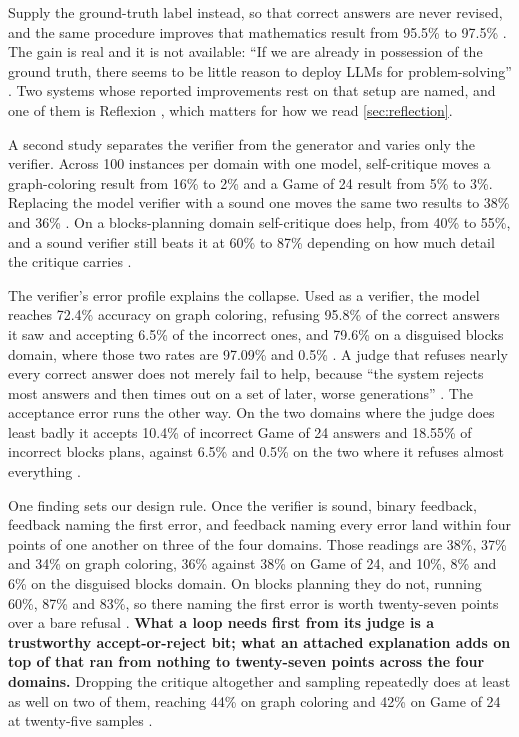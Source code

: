 Supply the ground-truth label instead, so that correct answers are never revised, and the same
procedure improves that mathematics result from 95.5\% to 97.5\%
\citep[Table~2]{huang2024selfcorrect}. The gain is real and it is not available: ``If we are already
in possession of the ground truth, there seems to be little reason to deploy LLMs for
problem-solving'' \citep[\S3]{huang2024selfcorrect}. Two systems whose reported improvements rest on
that setup are named, and one of them is Reflexion \citep[Table~1]{huang2024selfcorrect}, which
matters for how we read \cref{sec:reflection}.

A second study separates the verifier from the generator and varies only the verifier. Across 100
instances per domain with one model, self-critique moves a graph-coloring result from 16\% to 2\%
and a Game of 24 result from 5\% to 3\%. Replacing the model verifier with a sound one moves the
same two results to 38\% and 36\% \citep[Table~1]{stechly2025selfverification}. On a
blocks-planning domain self-critique does help, from 40\% to 55\%, and a sound verifier still beats
it at 60\% to 87\% depending on how much detail the critique carries
\citep[Table~1]{stechly2025selfverification}.

The verifier's error profile explains the collapse. Used as a verifier, the model reaches 72.4\%
accuracy on graph coloring, refusing 95.8\% of the correct answers it saw and accepting 6.5\% of the
incorrect ones, and 79.6\% on a disguised blocks domain, where those two rates are 97.09\% and 0.5\%
\citep[Table~2]{stechly2025selfverification}. A judge
that refuses nearly every correct answer does not merely fail to help, because ``the system rejects
most answers and then times out on a set of later, worse generations''
\citep[\S5]{stechly2025selfverification}. The acceptance error runs the other way. On the two
domains where the judge does least badly it accepts 10.4\% of incorrect Game of 24 answers and
18.55\% of incorrect blocks plans, against 6.5\% and 0.5\% on the two where it refuses almost
everything \citep[Table~2]{stechly2025selfverification}.

One finding sets our design rule. Once the verifier is sound, binary feedback, feedback naming the
first error, and feedback naming every error land within four points of one another on three of the
four domains. Those readings are 38\%, 37\% and 34\% on graph coloring, 36\% against 38\% on Game of
24, and 10\%, 8\% and 6\% on the disguised blocks domain. On blocks planning they do not, running 60\%, 87\% and
83\%, so there naming the first error is worth twenty-seven points over a bare refusal
\citep[Table~1]{stechly2025selfverification}. \textbf{What a loop needs first from its judge is a
trustworthy accept-or-reject bit; what an attached explanation adds on top of that ran from nothing
to twenty-seven points across the four domains.} Dropping the critique altogether and sampling
repeatedly does at least as well on two of them, reaching 44\% on graph coloring and 42\% on Game of
24 at twenty-five samples \citep[Table~1]{stechly2025selfverification}.

